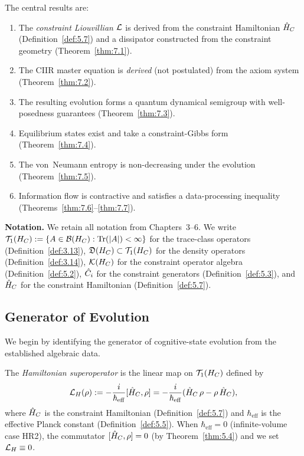 The central results are:
\begin{enumerate}
  \item The \emph{constraint Liouvillian} $\mathcal{L}$ is derived from the
    constraint Hamiltonian $\hat{H}_C$ (Definition~\ref{def:5.7}) and a
    dissipator constructed from the constraint geometry
    (Theorem~\ref{thm:7.1}).
  \item The CIIR master equation is \emph{derived} (not postulated) from
    the axiom system (Theorem~\ref{thm:7.2}).
  \item The resulting evolution forms a quantum dynamical semigroup
    with well-posedness guarantees (Theorem~\ref{thm:7.3}).
  \item Equilibrium states exist and take a constraint-Gibbs form
    (Theorem~\ref{thm:7.4}).
  \item The von~Neumann entropy is non-decreasing under the evolution
    (Theorem~\ref{thm:7.5}).
  \item Information flow is contractive and satisfies a data-processing
    inequality (Theorems~\ref{thm:7.6}--\ref{thm:7.7}).
\end{enumerate}

\medskip
\noindent\textbf{Notation.}  We retain all notation from Chapters~3--6.
We write $\mathcal{T}_1(H_C) := \{A \in \mathcal{B}(H_C) : \mathrm{Tr}(|A|) < \infty\}$
for the trace-class operators (Definition~\ref{def:3.13}),
$\mathfrak{D}(H_C) \subset \mathcal{T}_1(H_C)$ for the density
operators (Definition~\ref{def:3.14}), $\mathcal{K}(H_C)$ for the constraint
operator algebra (Definition~\ref{def:5.2}), $\hat{C}_i$ for the
constraint generators (Definition~\ref{def:5.3}), and $\hat{H}_C$ for
the constraint Hamiltonian (Definition~\ref{def:5.7}).

\subsection{Generator of Evolution}
\label{sec:ch7:generator}

We begin by identifying the generator of cognitive-state evolution from
the established algebraic data.

\begin{definition}
\label{def:7.1}
The \emph{Hamiltonian superoperator} is the linear map on
$\mathcal{T}_1(H_C)$ defined by
\[
  \mathcal{L}_H(\rho) :=
  -\frac{i}{\hbar_{\mathrm{eff}}}[\hat{H}_C, \rho]
  = -\frac{i}{\hbar_{\mathrm{eff}}}(\hat{H}_C\,\rho - \rho\,\hat{H}_C),
\]
where $\hat{H}_C$ is the constraint Hamiltonian
\textup{(}Definition~\textup{\ref{def:5.7})} and
$\hbar_{\mathrm{eff}}$ is the effective Planck constant
\textup{(}Definition~\textup{\ref{def:5.5})}.  When
$\hbar_{\mathrm{eff}} = 0$ \textup{(}infinite-volume case
HR2\textup{)}, the commutator $[\hat{H}_C, \rho] = 0$
\textup{(}by Theorem~\textup{\ref{thm:5.4})} and we set
$\mathcal{L}_H \equiv 0$.
\end{definition}

